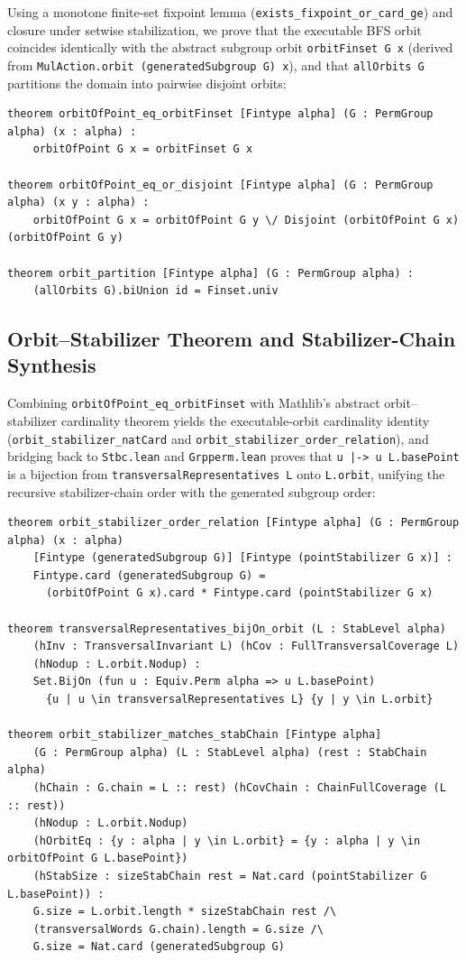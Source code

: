 \documentclass[11pt,a4paper]{article}
\begin{document}
Using a monotone finite-set fixpoint lemma (\texttt{exists\_\allowbreak fixpoint\_\allowbreak or\_card\_ge}) and closure under setwise stabilization, we prove that the executable BFS orbit coincides identically with the abstract subgroup orbit \texttt{orbitFinset G x} (derived from \texttt{MulAction.orbit (generatedSubgroup G) x}), and that \texttt{allOrbits G} partitions the domain into pairwise disjoint orbits:

\begin{lstlisting}[language=Lean4]
theorem orbitOfPoint_eq_orbitFinset [Fintype alpha] (G : PermGroup alpha) (x : alpha) :
    orbitOfPoint G x = orbitFinset G x

theorem orbitOfPoint_eq_or_disjoint [Fintype alpha] (G : PermGroup alpha) (x y : alpha) :
    orbitOfPoint G x = orbitOfPoint G y \/ Disjoint (orbitOfPoint G x) (orbitOfPoint G y)

theorem orbit_partition [Fintype alpha] (G : PermGroup alpha) :
    (allOrbits G).biUnion id = Finset.univ
\end{lstlisting}

\subsection{Orbit--Stabilizer Theorem and Stabilizer-Chain Synthesis}
Combining \texttt{orbitOfPoint\_\allowbreak eq\_orbitFinset} with Mathlib's abstract orbit--stabilizer cardinality theorem yields the executable-orbit cardinality identity (\texttt{orbit\_\allowbreak stabilizer\_natCard} and \texttt{orbit\_\allowbreak stabilizer\_\allowbreak order\_relation}), and bridging back to \texttt{Stbc.lean} and \texttt{Grpperm.lean} proves that \texttt{u |-> u L.basePoint} is a bijection from \texttt{transversalRepresentatives L} onto \texttt{L.orbit}, unifying the recursive stabilizer-chain order with the generated subgroup order:

\begin{lstlisting}[language=Lean4]
theorem orbit_stabilizer_order_relation [Fintype alpha] (G : PermGroup alpha) (x : alpha)
    [Fintype (generatedSubgroup G)] [Fintype (pointStabilizer G x)] :
    Fintype.card (generatedSubgroup G) =
      (orbitOfPoint G x).card * Fintype.card (pointStabilizer G x)

theorem transversalRepresentatives_bijOn_orbit (L : StabLevel alpha)
    (hInv : TransversalInvariant L) (hCov : FullTransversalCoverage L)
    (hNodup : L.orbit.Nodup) :
    Set.BijOn (fun u : Equiv.Perm alpha => u L.basePoint)
      {u | u \in transversalRepresentatives L} {y | y \in L.orbit}

theorem orbit_stabilizer_matches_stabChain [Fintype alpha]
    (G : PermGroup alpha) (L : StabLevel alpha) (rest : StabChain alpha)
    (hChain : G.chain = L :: rest) (hCovChain : ChainFullCoverage (L :: rest))
    (hNodup : L.orbit.Nodup)
    (hOrbitEq : {y : alpha | y \in L.orbit} = {y : alpha | y \in orbitOfPoint G L.basePoint})
    (hStabSize : sizeStabChain rest = Nat.card (pointStabilizer G L.basePoint)) :
    G.size = L.orbit.length * sizeStabChain rest /\
    (transversalWords G.chain).length = G.size /\
    G.size = Nat.card (generatedSubgroup G)
\end{lstlisting}
\end{document}
